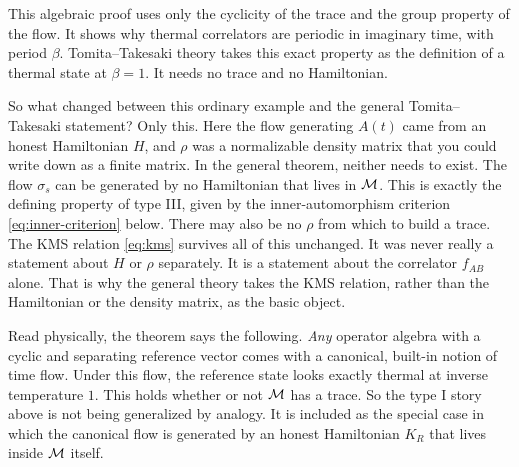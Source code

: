 \begin{physconnect}
This algebraic proof uses only the cyclicity of the trace and the group property of the flow. It shows why
thermal correlators are periodic in imaginary time, with period $\beta$. Tomita--Takesaki theory takes this
exact property as the definition of a thermal state at $\beta=1$. It needs no trace and no Hamiltonian.

So what changed between this ordinary example and the general Tomita--Takesaki statement? Only this. Here the
flow generating $A(t)$ came from an honest Hamiltonian $H$, and $\rho$ was a normalizable density matrix that you
could write down as a finite matrix. In the general theorem, neither needs to exist. The flow $\sigma_s$ can be
generated by no Hamiltonian that lives in $\mathcal{M}$. This is exactly the defining property of type III, given by the
inner-automorphism criterion \eqref{eq:inner-criterion} below. There may also be no $\rho$ from which to build
a trace. The KMS relation \eqref{eq:kms} survives all of this unchanged. It was never really a statement about
$H$ or $\rho$ separately. It is a statement about the correlator $f_{AB}$ alone. That is why the general theory
takes the KMS relation, rather than the Hamiltonian or the density matrix, as the basic object.
\end{physconnect}

Read physically, the theorem says the following. \emph{Any} operator algebra with a cyclic and separating
reference vector comes with a canonical, built-in notion of time flow. Under this flow, the reference state
looks exactly thermal at inverse temperature $1$. This holds whether or not $\mathcal{M}$ has a trace. So the type I
story above is not being generalized by analogy. It is included as the special case in which the canonical
flow is generated by an honest Hamiltonian $K_R$ that lives inside $\mathcal{M}$ itself.

